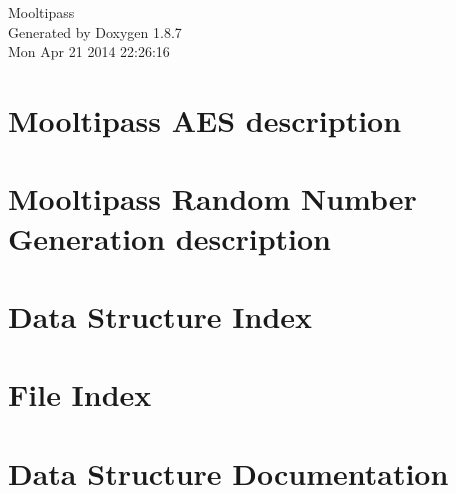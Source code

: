 \documentclass[twoside]{book}
\newcommand{\+}{\discretionary{\mbox{\scriptsize$\hookleftarrow$}}{}{}}
\newcommand{\clearemptydoublepage}{%
  \newpage{\pagestyle{empty}\cleardoublepage}%
}
\begin{document}
\hypersetup{pageanchor=false,
             bookmarks=true,
             bookmarksnumbered=true,
             pdfencoding=unicode
            }
\begin{titlepage}
\vspace*{7cm}
\begin{center}%
{\Large Mooltipass }\\
\vspace*{1cm}
{\large Generated by Doxygen 1.8.7}\\
\vspace*{0.5cm}
{\small Mon Apr 21 2014 22:26:16}\\
\end{center}
\end{titlepage}
\clearemptydoublepage
\tableofcontents
\clearemptydoublepage
{}
\hypersetup{pageanchor=true}

\chapter{Mooltipass A\+E\+S description}
\label{md_src__a_e_s__r_e_a_d_m_e}
\hypertarget{md_src__a_e_s__r_e_a_d_m_e}{}

\chapter{Mooltipass Random Number Generation description}
\label{md_src__r_n_g__r_e_a_d_m_e}
\hypertarget{md_src__r_n_g__r_e_a_d_m_e}{}

\chapter{Data Structure Index}

\chapter{File Index}

\chapter{Data Structure Documentation}











\end{document}
